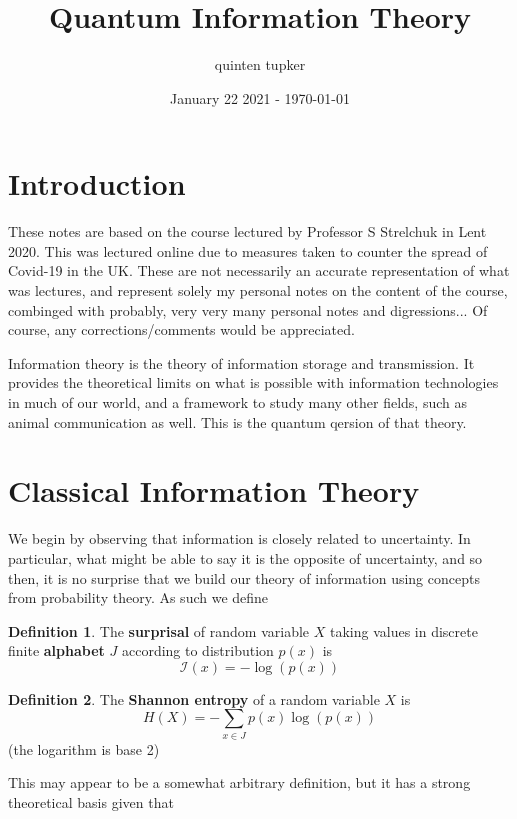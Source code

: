 \documentclass{article}
\title{Quantum Information Theory}
\author{quinten tupker}
\date{January 22 2021 - \today}
\theoremstyle{definition}
\newtheorem{definition}{Definition}
\begin{document}
\maketitle

\section*{Introduction}

These notes are based on the course lectured by Professor S Strelchuk in Lent 2020.
This was lectured online due to measures taken to counter the spread of Covid-19
in the UK. These are not necessarily an accurate representation of what was
lectures, and represent solely my personal notes on the content of the course,
combinged with probably, very very many personal notes and digressions... Of
course, any corrections/comments would be appreciated.

Information theory is the theory of information storage and transmission. It
provides the theoretical limits on what is possible with information
technologies in much of our world, and a framework to study many other fields,
such as animal communication as well. This is the quantum qersion of that
theory.

\section{Classical Information Theory}

We begin by observing that information is closely related to uncertainty. In
particular, what might be able to say it is the opposite of uncertainty, and so
then, it is no surprise that we build our theory of information using concepts
from probability theory. As such we define

\begin{definition}
  The \textbf{surprisal} of random variable $X$ taking values in discrete finite
  \textbf{alphabet} $J$ according to distribution $p(x)$ is
  $$ \mathcal{I}(x) = - \log(p(x)) $$
\end{definition}

\begin{definition}
  The \textbf{Shannon entropy} of a random variable $X$ is
  $$ H(X) = -\sum_{x \in J} p(x) \log(p(x)) $$
  (the logarithm is base 2)
\end{definition}

This may appear to be a somewhat arbitrary definition, but it has a strong
theoretical basis given that
\end{document}
